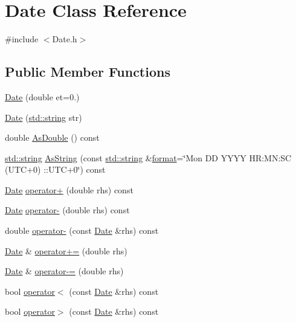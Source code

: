 \hypertarget{class_date}{\section{Date Class Reference}
\label{class_date}
}


{\ttfamily \#include $<$Date.\+h$>$}

\subsection*{Public Member Functions}
\begin{DoxyCompactItemize}
\item 
\hyperlink{class_date_a02e14e792c9a84dec9f7108d0c3b40c2}{Date} (double et=0.)
\item 
\hyperlink{class_date_af909b4fc8d85c6feb129709441f6af5a}{Date} (\hyperlink{glext_8h_ae84541b4f3d8e1ea24ec0f466a8c568b}{std\+::string} str)
\item 
double \hyperlink{class_date_af5e52ad40ec03035f98ddd4bd5bfc2fd}{As\+Double} () const 
\item 
\hyperlink{glext_8h_ae84541b4f3d8e1ea24ec0f466a8c568b}{std\+::string} \hyperlink{class_date_ac952bc2fedfc299de91758e32b487810}{As\+String} (const \hyperlink{glext_8h_ae84541b4f3d8e1ea24ec0f466a8c568b}{std\+::string} \&\hyperlink{glext_8h_ae2d3db041c6004a67047659b42f73a44}{format}=\char`\"{}Mon D\+D Y\+Y\+Y\+Y H\+R\+:\+M\+N\+:\+S\+C (U\+T\+C+0) \+::U\+T\+C+0\char`\"{}) const 
\item 
\hyperlink{class_date}{Date} \hyperlink{class_date_a4728290c236875c0a0e909da57a732d1}{operator+} (double rhs) const 
\item 
\hyperlink{class_date}{Date} \hyperlink{class_date_a818a7809eb6a6c3c07e4f5e82fe32b2b}{operator-\/} (double rhs) const 
\item 
double \hyperlink{class_date_afa16e15bccb6a129ad4bec5aeff20967}{operator-\/} (const \hyperlink{class_date}{Date} \&rhs) const 
\item 
\hyperlink{class_date}{Date} \& \hyperlink{class_date_aa276629ba1fd2b5afce12aa79e638f5b}{operator+=} (double rhs)
\item 
\hyperlink{class_date}{Date} \& \hyperlink{class_date_a4e423fd26befbc87937e2eb1a62c9d96}{operator-\/=} (double rhs)
\item 
bool \hyperlink{class_date_a94ad75126c7edce05cad11c59ccc2136}{operator$<$} (const \hyperlink{class_date}{Date} \&rhs) const 
\item 
bool \hyperlink{class_date_a572f2eae7edfbb96c7556cb1b63c517a}{operator$>$} (const \hyperlink{class_date}{Date} \&rhs) const 

\end{DoxyCompactItemize}
